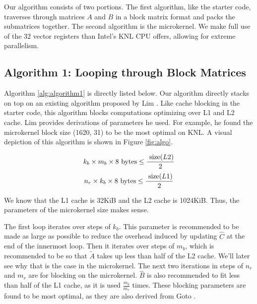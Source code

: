 \documentclass{article}
\begin{document}
Our algorithm consists of two portions. The first algorithm, like the starter code, traverses through matrices $A$ and $B$ in a block matrix format and packs the submatrices together. The second algorithm is the microkernel. We make full use of the 32 vector registers than Intel's KNL CPU offers, allowing for extreme parallelism.

\subsection{Algorithm 1: Looping through Block Matrices}
Algorithm \ref{alg:algorithm1} is directly listed below. Our algorithm directly stacks on top on an existing algorithm proposed by Lim \cite{10.1007/s10586-018-2810-y}. Like cache blocking in the starter code, this algorithm blocks computations optimizing over L1 and L2 cache. Lim provides derivations of parameters he used. For example, he found the microkernel block size (1620, 31) to be the most optimal on KNL. A visual depiction of this algorithm is shown in Figure \ref{fig:algo}.

$$k_b \times m_b \times 8 \textnormal{ bytes} \leq \frac{\textnormal{ size}(L2)}{2}$$
$$n_r \times k_b \times 8 \textnormal{ bytes} \leq \frac{\textnormal{ size}(L1)}{2}$$

We know that the L1 cache is 32KiB and the L2 cache is 1024KiB. Thus, the parameters of the microkernel size makes sense.

The first loop iterates over steps of $k_b$. This parameter is recommended to be made as large as possible to reduce the overhead induced by updating $\hat{C}$ at the end of the innermost loop. Then it iterates over steps of $m_b$, which is recommended to be so that $\tilde{A}$ takes up less than half of the L2 cache. We'll later see why that is the case in the microkernel. The next two iterations in steps of $n_r$ and $m_r$ are for blocking on the microkernel. $\hat{B}$ is also recommended to fit less than half of the L1 cache, as it is used $\frac{m_b}{m_r}$ times. These blocking parameters are found to be most optimal, as they are also derived from Goto \cite{10.1145/1356052.1356053}.
\end{document}

